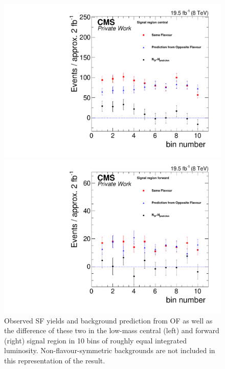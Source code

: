 \begin{figure}[htbp]
\centering
\begin{minipage}[t]{0.49\textwidth}
  \includegraphics[width=\textwidth]{plots/results/YieldvsLumi_Bins_SignalCentral_Mll_edgeMassFull2012.pdf}
\end{minipage}
\begin{minipage}[t]{0.49\textwidth}
\includegraphics[width=\textwidth]{plots/results/YieldvsLumi_Bins_SignalForward_Mll_edgeMassFull2012.pdf}
\end{minipage}

\caption{Observed SF yields and background prediction from OF as well as the difference of these two in the low-mass central (left) and forward (right) signal region in 10 bins of roughly equal integrated luminosity. Non-flavour-symmetric backgrounds are not included in this representation of the result.}
\label{fig:timeDependece}
\end{figure}

